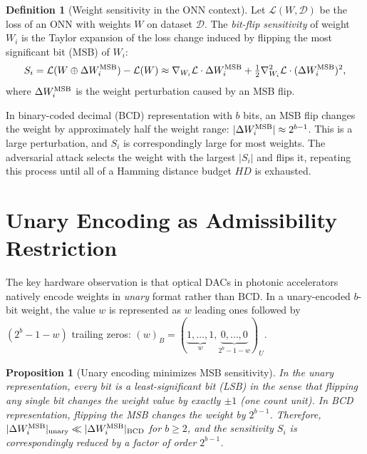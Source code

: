 \documentclass[11pt, openright, twoside]{book}
\theoremstyle{plain}
\newtheorem{proposition}[theorem]{Proposition}
\theoremstyle{definition}
\newtheorem{definition}[theorem]{Definition}
\theoremstyle{remark}
\begin{document}
\begin{definition}[Weight sensitivity in the ONN context]
\label{def:weight_sensitivity}
Let $\mathcal{L}(W, \mathcal{D})$ be the loss of an ONN with weights $W$ on dataset
$\mathcal{D}$. The \emph{bit-flip sensitivity} of weight $W_i$ is the Taylor expansion
of the loss change induced by flipping the most significant bit (MSB) of $W_i$:
\begin{equation}
  S_i = \mathcal{L}(W \oplus \Delta W_i^{\rm MSB}) - \mathcal{L}(W)
  \approx \nabla_{W_i}\mathcal{L}\cdot\Delta W_i^{\rm MSB}
  + \tfrac{1}{2}\nabla^2_{W_i}\mathcal{L}\cdot(\Delta W_i^{\rm MSB})^2,
  \label{eq:onn_sensitivity}
\end{equation}
where $\Delta W_i^{\rm MSB}$ is the weight perturbation caused by an MSB flip.
\end{definition}

In binary-coded decimal (BCD) representation with $b$ bits, an MSB flip changes the
weight by approximately half the weight range: $|\Delta W_i^{\rm MSB}| \approx 2^{b-1}$.
This is a large perturbation, and $S_i$ is correspondingly large for most weights. The
adversarial attack selects the weight with the largest $|S_i|$ and flips it, repeating
this process until all of a Hamming distance budget $HD$ is exhausted.

\section{Unary Encoding as Admissibility Restriction}

The key hardware observation is that optical DACs in photonic accelerators natively
encode weights in \emph{unary} format rather than BCD. In a unary-encoded $b$-bit weight,
the value $w$ is represented as $w$ leading ones followed by $(2^b - 1 - w)$ trailing
zeros: $(w)_B = (\underbrace{1,\ldots,1}_{w},\underbrace{0,\ldots,0}_{2^b-1-w})_U$.

\begin{proposition}[Unary encoding minimizes MSB sensitivity]
\label{prop:unary_sensitivity}
In the unary representation, every bit is a least-significant bit (LSB) in the sense
that flipping any single bit changes the weight value by exactly $\pm 1$ (one count unit).
In BCD representation, flipping the MSB changes the weight by $2^{b-1}$. Therefore,
$|\Delta W_i^{\rm MSB}|_{\rm unary} \ll |\Delta W_i^{\rm MSB}|_{\rm BCD}$ for $b \geq 2$,
and the sensitivity $S_i$ is correspondingly reduced by a factor of order $2^{b-1}$.
\end{proposition}
\end{document}
